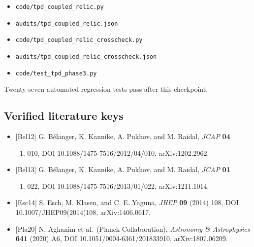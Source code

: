 \documentclass[
]{article}
\providecommand{\tightlist}{%
  \setlength{\itemsep}{0pt}\setlength{\parskip}{0pt}}
\begin{document}
\begin{itemize}
\tightlist
\item
  \texttt{code/tpd\_coupled\_relic.py}
\item
  \texttt{audits/tpd\_coupled\_relic.json}
\item
  \texttt{code/tpd\_coupled\_relic\_crosscheck.py}
\item
  \texttt{audits/tpd\_coupled\_relic\_crosscheck.json}
\item
  \texttt{code/test\_tpd\_phase3.py}
\end{itemize}

Twenty-seven automated regression tests pass after this checkpoint.

\hypertarget{verified-literature-keys}{%
\subsection{Verified literature keys}\label{verified-literature-keys}}

\begin{itemize}
\tightlist
\item
  {[}Bel12{]} G. Bélanger, K. Kannike, A. Pukhov, and M. Raidal,
  \emph{JCAP} \textbf{04}

  \begin{enumerate}
  \def\labelenumi{(\arabic{enumi})}
  \setcounter{enumi}{2011}
  \tightlist
  \item
    010, DOI 10.1088/1475-7516/2012/04/010, arXiv:1202.2962.
  \end{enumerate}
\item
  {[}Bel13{]} G. Bélanger, K. Kannike, A. Pukhov, and M. Raidal,
  \emph{JCAP} \textbf{01}

  \begin{enumerate}
  \def\labelenumi{(\arabic{enumi})}
  \setcounter{enumi}{2012}
  \tightlist
  \item
    022, DOI 10.1088/1475-7516/2013/01/022, arXiv:1211.1014.
  \end{enumerate}
\item
  {[}Esc14{]} S. Esch, M. Klasen, and C. E. Yaguna, \emph{JHEP}
  \textbf{09} (2014) 108, DOI 10.1007/JHEP09(2014)108, arXiv:1406.0617.
\item
  {[}Pla20{]} N. Aghanim et al.~(Planck Collaboration), \emph{Astronomy
  \& Astrophysics} \textbf{641} (2020) A6, DOI
  10.1051/0004-6361/201833910, arXiv:1807.06209.
\end{itemize}

\newpage
\end{document}
